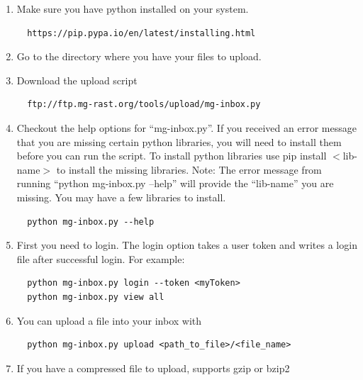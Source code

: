 \documentclass[12pt,fullpage]{report}
\begin{document}
\begin{enumerate}
\item Make sure you have python installed on your system.
\begin{small}
\begin{lstlisting}
  https://pip.pypa.io/en/latest/installing.html
\end{lstlisting}
\end{small}
\item Go to the directory where you have your files to upload.

\item Download the upload script
\begin{small}
\begin{lstlisting}
  ftp://ftp.mg-rast.org/tools/upload/mg-inbox.py
\end{lstlisting}
\end{small}
\item Checkout the help options for “mg-inbox.py”. If you received an error message that you are missing certain python libraries, you will need to install them before you can run the script. To install python libraries use pip install $<$lib-name$>$ to install the missing libraries.
Note: The error message from running “python mg-inbox.py --help” will provide the “lib-name” you are missing. You may have a few libraries to install.
\begin{small}
\begin{lstlisting}
  python mg-inbox.py --help
\end{lstlisting}
\end{small}
\item First you need to login. The login option takes a user token and writes a login file after successful login. For example:
\begin{small}
\begin{lstlisting}
  python mg-inbox.py login --token <myToken>
  python mg-inbox.py view all
\end{lstlisting}
\end{small}
\item You can upload a file into your inbox with
\begin{small}
\begin{lstlisting}
  python mg-inbox.py upload <path_to_file>/<file_name>
\end{lstlisting}
\end{small}
\item If you have a compressed file to upload, supports gzip or bzip2
\begin{small}

\end{small}
\end{enumerate}
\end{document}
